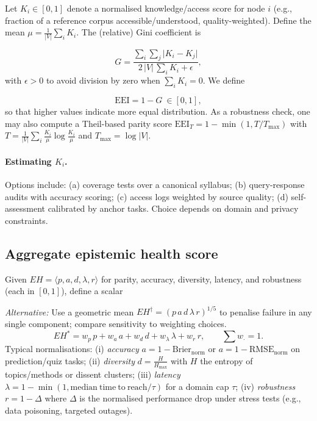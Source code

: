 \documentclass[12pt]{article}
\begin{document}
Let $K_i\in[0,1]$ denote a normalised knowledge/access score for node $i$ (e.g., fraction of a reference corpus accessible/understood, quality-weighted). Define the mean $\mu=\frac{1}{|V|}\sum_{i} K_i$. The (relative) Gini coefficient is

\begin{equation}
G=\frac{\sum_{i}\sum_{j}\lvert K_i-K_j\rvert}{2\,|V|\,\sum_{i} K_i+\epsilon},
\end{equation} with $\epsilon\!>\!0$ to avoid division by zero when $\sum_i K_i=0$. We define

\begin{equation}
\mathrm{EEI}=1-G\ \in[0,1],
\end{equation}
so that higher values indicate more equal distribution. As a robustness check, one may also compute a Theil-based parity score $\mathrm{EEI}_T=1-\min(1,T/T_{\max})$ with $T=\frac{1}{|V|}\sum_i \frac{K_i}{\mu}\log\frac{K_i}{\mu}$ and $T_{\max}=\log |V|$.

\paragraph{Estimating $K_i$.} Options include: (a) coverage tests over a canonical syllabus; (b) query-response audits with accuracy scoring; (c) access logs weighted by source quality; (d) self-assessment calibrated by anchor tasks. Choice depends on domain and privacy constraints.

\subsection{Aggregate epistemic health score} Given $EH=\langle p,a,d,\lambda,r\rangle$ for parity, accuracy, diversity, latency, and robustness (each in $[0,1]$), define a scalar

\emph{Alternative:} Use a geometric mean $EH^{\dagger}=(p\,a\,d\,\lambda\,r)^{1/5}$ to penalise failure in any single component; compare sensitivity to weighting choices.
\begin{equation}
EH^{\ast}=w_p\,p+w_a\,a+w_d\,d+w_\lambda\,\lambda+w_r\,r,\qquad \sum w_{\cdot}=1.
\end{equation}
Typical normalisations: (i) \emph{accuracy} $a=1-\mathrm{Brier}_{\mathrm{norm}}$ or $a=1-\mathrm{RMSE}_{\mathrm{norm}}$ on prediction/quiz tasks; (ii) \emph{diversity} $d=\frac{H}{H_{\max}}$ with $H$ the entropy of topics/methods or dissent clusters; (iii) \emph{latency} $\lambda=1-\min(1,\mathrm{median\ time\ to\ reach}/\tau)$ for a domain cap $\tau$; (iv) \emph{robustness} $r=1-\Delta$ where $\Delta$ is the normalised performance drop under stress tests (e.g., data poisoning, targeted outages).
\end{document}
